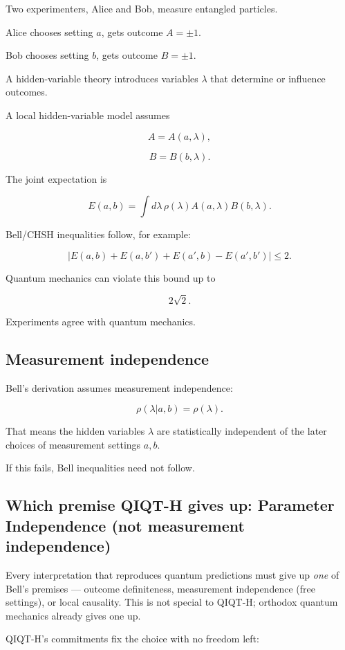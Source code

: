 \documentclass[11pt,a4paper]{article}
\begin{document}
Two experimenters, Alice and Bob, measure entangled particles.

Alice chooses setting $a$, gets outcome $A=\pm1$.

Bob chooses setting $b$, gets outcome $B=\pm1$.

A hidden-variable theory introduces variables $\lambda$ that determine or influence outcomes.

A local hidden-variable model assumes

\[
A=A(a,\lambda),
\]

\[
B=B(b,\lambda).
\]

The joint expectation is

\[
E(a,b)=\int d\lambda\, \rho(\lambda) A(a,\lambda)B(b,\lambda).
\]

Bell/CHSH inequalities follow, for example:

\[
|E(a,b)+E(a,b')+E(a',b)-E(a',b')|\leq 2.
\]

Quantum mechanics can violate this bound up to

\[
2\sqrt{2}.
\]

Experiments agree with quantum mechanics.

\subsection{Measurement independence}

Bell’s derivation assumes measurement independence:

\[
\rho(\lambda|a,b)=\rho(\lambda).
\]

That means the hidden variables $\lambda$ are statistically independent of the later choices of measurement settings $a,b$.

If this fails, Bell inequalities need not follow.

\subsection{Which premise QIQT-H gives up: Parameter Independence (not measurement independence)}

Every interpretation that reproduces quantum predictions must give up \emph{one} of Bell's premises — outcome definiteness, measurement independence (free settings), or local causality. This is not special to QIQT-H; orthodox quantum mechanics already gives one up.

QIQT-H's commitments fix the choice with no freedom left:
\end{document}
